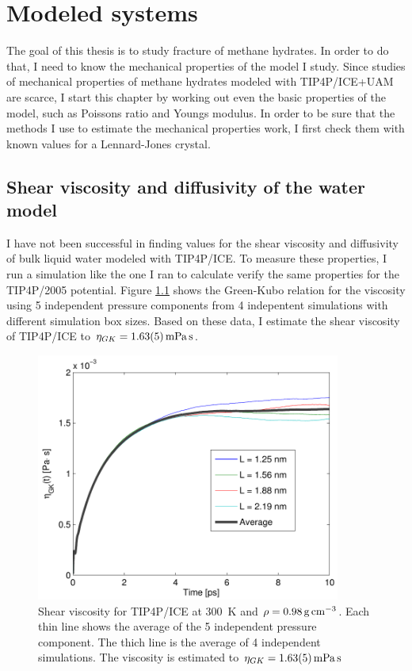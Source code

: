 
\chapter{Modeled systems}
\label{ch:modeledsystems}
The goal of this thesis is to study fracture of methane hydrates. In order to do that, I need to know the mechanical properties of the model I study. Since studies of mechanical properties of methane hydrates modeled with TIP4P/ICE+UAM are scarce, I start this chapter by working out even the basic properties of the model, such as Poissons ratio and Youngs modulus. In order to be sure that the methods I use to estimate the mechanical properties work, I first check them with known values for a Lennard-Jones crystal. 

\section{Shear viscosity and diffusivity of the water model}
I have not been successful in finding values for the shear viscosity and diffusivity of bulk liquid water modeled with TIP4P/ICE. To measure these properties, I run a simulation like the one I ran to calculate verify the same properties for the TIP4P/2005 potential. Figure \ref{fig:viscosity_green_kubo_tip4p_ice} shows the Green-Kubo relation for the viscosity using 5 independent pressure components from 4 indepentent simulations with different simulation box sizes. Based on these data, I estimate the shear viscosity of TIP4P/ICE to $\eta_{GK} = \text{\SI{1.63\pm 0.05}{\milli\pascal\second}}$. 

\begin{figure}
\centering
\includegraphics[width=10cm]{../figures/thesis/viscosity_green_kubo_tip4p_ice.pdf}
\caption{Shear viscosity for TIP4P/ICE at \SI{300}{\kelvin} and $\rho = \text{\SI{0.98}{\gram\per\cubic\cm}}$. Each thin line shows the average of the 5 independent pressure component. The thich line is the average of 4 independent simulations. The viscosity is estimated to $\eta_{GK} = \text{\SI{1.63\pm0.05}{\milli\pascal\second}}$}
\label{fig:viscosity_green_kubo_tip4p_ice}
\end{figure}

